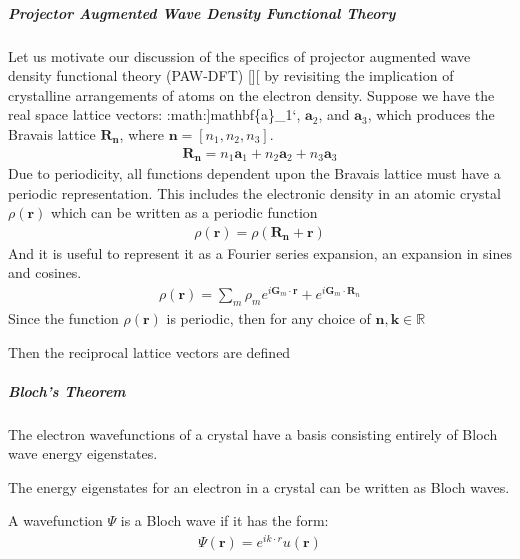 \documentclass[letterpaper,10pt,english]{sphinxmanual}
\begin{document}
\subparagraph{Projector Augmented Wave Density Functional Theory}
\label{\detokenize{dft/dft_paw:projector-augmented-wave-density-functional-theory}}\label{\detokenize{dft/dft_paw:dft-paw}}\label{\detokenize{dft/dft_paw::doc}}
Let us motivate our discussion of the specifics of projector augmented wave density functional theory (PAW-DFT) {[}{]}{[} by revisiting the implication of crystalline arrangements of atoms on the electron density. Suppose we have the real space lattice vectors: :math:{]}mathbf\{a\}\_1{}`, \(\mathbf{a}_2\), and \(\mathbf{a}_3\), which produces the Bravais lattice \(\mathbf{R}_{\mathbf{n}}\), where \(\mathbf{n}=\left[n_1,n_2,n_3\right]\).
\begin{equation*}
\begin{split}\mathbf{R}_{\mathbf{n}} = n_1 \mathbf{a}_1 + n_2 \mathbf{a}_2 + n_3 \mathbf{a}_3\end{split}
\end{equation*}
Due to periodicity, all functions dependent upon the Bravais lattice must have a periodic representation.  This includes the electronic density in an atomic crystal \(\rho(\mathbf{r})\) which can be written as a periodic function
\begin{equation*}
\begin{split}\rho(\mathbf{r}) = \rho(\mathbf{R}_{\mathbf{n}} + \mathbf{r})\end{split}
\end{equation*}
And it is useful to represent it as a Fourier series expansion, an expansion in sines and cosines.
\begin{equation*}
\begin{split}\rho(\mathbf{r}) = \sum_m \rho_m e^{i \mathbf{G}_m \cdot \mathbf{r}} + e^{i \mathbf{G}_m \cdot \mathbf{R}_n}\end{split}
\end{equation*}
Since the function \(\rho(\mathbf{r})\) is periodic, then for any choice of \(\mathbf{n},\mathbf{k} \in \mathbb{R}\)

Then the reciprocal lattice vectors are defined


\subparagraph{Bloch’s Theorem}
\label{\detokenize{dft/dft_paw:bloch-s-theorem}}
The electron wavefunctions of a crystal have a basis consisting entirely of Bloch wave energy eigenstates.

The energy eigenstates for an electron in a crystal can be written as Bloch waves.

A wavefunction \(\Psi\) is a Bloch wave if it has the form:
\begin{equation*}
\begin{split}\Psi(\mathbf{r}) = e^{ik \cdot r} u(\mathbf{r})\end{split}
\end{equation*}
\end{document}
